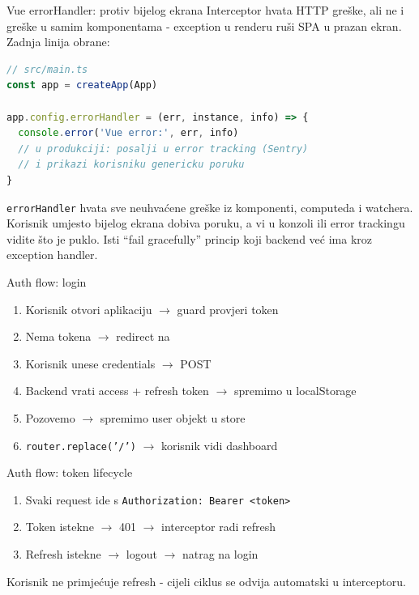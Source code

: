 \begin{frame}[fragile,shrink=5]{Vue errorHandler: protiv bijelog ekrana}
Interceptor hvata HTTP greške, ali ne i greške u samim komponentama - exception u renderu ruši SPA u prazan ekran. Zadnja linija obrane:

\begin{lstlisting}[language=typescript]
// src/main.ts
const app = createApp(App)

app.config.errorHandler = (err, instance, info) => {
  console.error('Vue error:', err, info)
  // u produkciji: posalji u error tracking (Sentry)
  // i prikazi korisniku genericku poruku
}
\end{lstlisting}

\vspace{0.4em}
\texttt{errorHandler} hvata sve neuhvaćene greške iz komponenti, computeda i watchera. Korisnik umjesto bijelog ekrana dobiva poruku, a vi u konzoli ili error trackingu vidite što je puklo. Isti \enquote{fail gracefully} princip koji backend već ima kroz exception handler.
\end{frame}

\begin{frame}{Auth flow: login}
\begin{enumerate}
  \item Korisnik otvori aplikaciju $\rightarrow$ guard provjeri token
  \item Nema tokena $\rightarrow$ redirect na 
  \item Korisnik unese credentials $\rightarrow$ POST 
  \item Backend vrati access + refresh token $\rightarrow$ spremimo u localStorage
  \item Pozovemo  $\rightarrow$ spremimo user objekt u store
  \item \texttt{router.replace('/')} $\rightarrow$ korisnik vidi dashboard
\end{enumerate}
\end{frame}

\begin{frame}{Auth flow: token lifecycle}
\begin{enumerate}
  \item Svaki request ide s \texttt{Authorization: Bearer <token>}
  \item Token istekne $\rightarrow$ 401 $\rightarrow$ interceptor radi refresh
  \item Refresh istekne $\rightarrow$ logout $\rightarrow$ natrag na login
\end{enumerate}

\vspace{0.6em}
Korisnik ne primjećuje refresh - cijeli ciklus se odvija automatski u interceptoru.
\end{frame}

